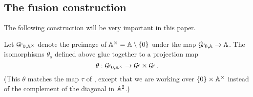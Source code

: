 \documentclass[draft]{article} %
\begin{document}


\subsection{The fusion construction}
\label{ss:fuscon}


The following construction will be very important in this paper.  

Let $ \Gr_{0, \AA^\times} $ denote the preimage of $\Ax = \AA \setminus \{0\}$ under the map $\Gr_{0,\AA} \rightarrow \AA $.  
% 
% 
The isomorphisms $ \theta_s $ defined above glue together to a projection map
\begin{equation}
\label{eq:mvitau}
    \theta : \Gr_{0, \AA^\times} \rightarrow \Gr \times \Gr \, .
\end{equation}
(This $\theta$ matches the map $ \tau $ of \cite{mirkovic2007geometric}, except that we are working over $ \{0 \} \times \AA^\times$ instead of the complement of the diagonal in $ \AA^2 $.)
\end{document}
